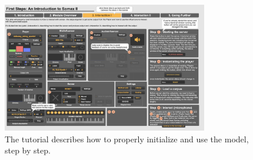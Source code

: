 \documentclass[11pt,a4paper]{report}
\begin{document}
 \begin{figure}[h!]
    \centering        
 	\includegraphics[width=0.8\textwidth, keepaspectratio]{img/tutorial.png}
    \caption{The tutorial describes how to properly initialize and use the model, step by step.}
\end{figure}
\end{document}
